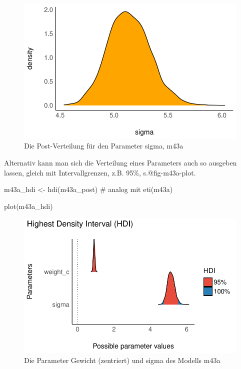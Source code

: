 \documentclass[
  a4paper,
  DIV=11]{scrreprt}
\newenvironment{Shaded}{\begin{snugshade}}{\end{snugshade}}
\newcommand{\CommentTok}[1]{\textcolor[rgb]{0.37,0.37,0.37}{#1}}
\newcommand{\FunctionTok}[1]{\textcolor[rgb]{0.28,0.35,0.67}{#1}}
\newcommand{\NormalTok}[1]{\textcolor[rgb]{0.00,0.23,0.31}{#1}}
\newcommand{\OtherTok}[1]{\textcolor[rgb]{0.00,0.23,0.31}{#1}}
\theoremstyle{definition}
\theoremstyle{remark}
\begin{document}
\begin{figure}[H]

{\centering \includegraphics{./lineare-modelle_files/figure-pdf/fig-m43a-post-1.pdf}

}

\caption{\label{fig-m43a-post}Die Post-Verteilung für den Parameter
sigma, m43a}

\end{figure}

Alternativ kann man sich die Verteilung eines Parameters auch so
ausgeben lassen, gleich mit Intervallgrenzen, z.B. 95\%,
s.@fig-m43a-plot.

\begin{Shaded}
\begin{Highlighting}[]
\NormalTok{m43a\_hdi }\OtherTok{\textless{}{-}} \FunctionTok{hdi}\NormalTok{(m43a\_post)  }\CommentTok{\# analog mit eti(m43a)}

\FunctionTok{plot}\NormalTok{(m43a\_hdi)}
\end{Highlighting}
\end{Shaded}

\begin{figure}[H]

{\centering \includegraphics{./lineare-modelle_files/figure-pdf/fig-m43a-plot-1.pdf}

}

\caption{\label{fig-m43a-plot}Die Parameter Gewicht (zentriert) und
sigma des Modells m43a}

\end{figure}
\end{document}
